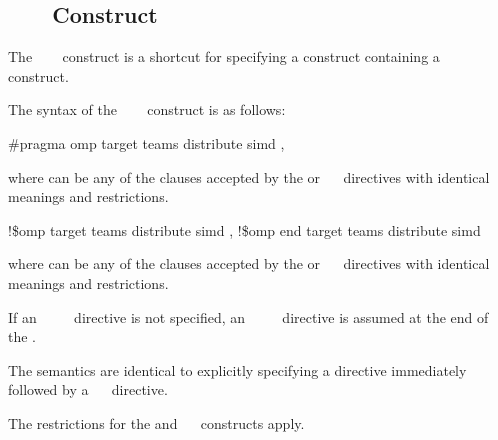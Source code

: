 \subsection{~~~ Construct}
\label{subsec:target teams distribute simd construct}
\summary
The ~~~ construct is a shortcut for specifying a  construct 
containing a ~~ construct.

\syntax
The syntax of the ~~~ construct is as follows:

\ccppspecificstart
\begin{boxedcode}
\#pragma omp target teams distribute simd \plc{[clause[ [},\plc{] clause] ... ]}
\end{boxedcode}

where  can be any of the clauses accepted by the  or 
~~ directives with identical meanings and restrictions.
\ccppspecificend

\fortranspecificstart
\begin{boxedcode}
!\$omp target teams distribute simd \plc{[clause[ [},\plc{] clause] ... ]}
\plc{[}!\$omp end target teams distribute simd\plc{]}
\end{boxedcode}

where  can be any of the clauses accepted by the  or 
~~ directives with identical meanings and restrictions.

If an ~~~~ directive is not specified, an 
~~~~ directive is assumed at the end of the .
\fortranspecificend

\descr
The semantics are identical to explicitly specifying a  directive immediately 
followed by a ~~ directive.

\restrictions
The restrictions for the  and ~~ constructs apply.

